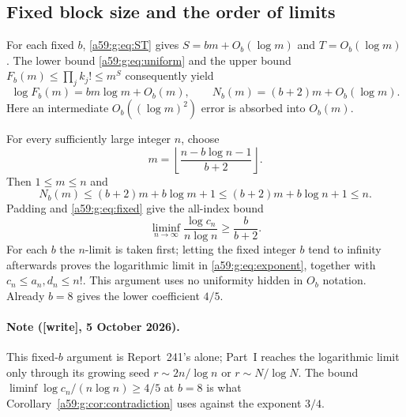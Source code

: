 \documentclass[11pt,letterpaper]{article}
\theoremstyle{remark}\newtheorem{remark}[theorem]{Remark}
\newcommand{\wtag}{\textup{[write]}}
\theoremstyle{remark}\newtheorem{wremark}{Remark}\renewcommand{\thewremark}{W\arabic{wremark}}
\theoremstyle{plain}\newtheorem{wcorollary}[wremark]{Corollary}
\begin{document}
\subsection{Fixed block size and the order of limits}\label{a59:g:sub:fixed}
For each fixed $b$, \eqref{a59:g:eq:ST} gives $S=bm+O_b(\log m)$ and $T=O_b(\log m)$. The lower bound \eqref{a59:g:eq:uniform} and the upper bound
$F_b(m)\leq\prod_j k_j!\leq m^S$ consequently yield
\begin{equation}\label{a59:g:eq:fixed}
 \log F_b(m)=bm\log m+O_b(m),\qquad
 N_b(m)=(b+2)m+O_b(\log m).
\end{equation}
Here an intermediate $O_b((\log m)^2)$ error is absorbed into $O_b(m)$.

For every sufficiently large integer $n$, choose
\begin{equation}\label{a59:g:eq:m-choice}
 m=\left\lfloor\frac{n-b\log n-1}{b+2}\right\rfloor.
\end{equation}
Then $1\leq m\leq n$ and
\begin{equation}\label{a59:g:eq:fits}
 N_b(m)\leq(b+2)m+b\log m+1
          \leq(b+2)m+b\log n+1\leq n.
\end{equation}
Padding and \eqref{a59:g:eq:fixed} give the all-index bound
\begin{equation}\label{a59:g:eq:fixed-exponent}
 \liminf_{n\to\infty}\frac{\log c_n}{n\log n}\geq\frac{b}{b+2}.
\end{equation}
For each $b$ the $n$-limit is taken first; letting the fixed integer $b$ tend to infinity afterwards proves the logarithmic limit in \eqref{a59:g:eq:exponent}, together with $c_n\leq a_n,d_n\leq n!$. This argument uses no uniformity hidden in $O_b$ notation. Already $b=8$ gives the lower coefficient $4/5$.

\paragraph{Note (\wtag, 5 October 2026).} This fixed-$b$ argument is
Report~241's alone; Part~I reaches the logarithmic limit only through its
growing seed $r\sim2n/\log n$ or $r\sim N/\log N$. The bound
$\liminf\log c_n/(n\log n)\ge4/5$ at $b=8$ is what
Corollary~\ref{a59:g:cor:contradiction} uses against the exponent $3/4$.
\end{document}
